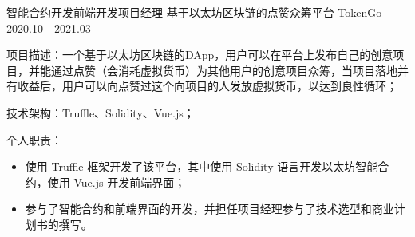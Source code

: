 \begin{cventries}
  \cventry
    {智能合约开发{\enskip\cdotp\enskip}前端开发{\enskip\cdotp\enskip}项目经理} %
    {基于以太坊区块链的点赞众筹平台 TokenGo} %
    {2020.10 - 2021.03} %
    {} %
    {
      \begin{cvitems}
        \item {项目描述：一个基于以太坊区块链的DApp，用户可以在平台上发布自己的创意项目，并能通过点赞（会消耗虚拟货币）为其他用户的创意项目众筹，当项目落地并有收益后，用户可以向点赞过这个向项目的人发放虚拟货币，以达到良性循环；} 
        \item {技术架构：Truffle、Solidity、Vue.js；}
        \item {个人职责：}
          \begin{itemize}
            \item {使用 Truffle 框架开发了该平台，其中使用 Solidity 语言开发以太坊智能合约，使用 Vue.js 开发前端界面；}
            \item {参与了智能合约和前端界面的开发，并担任项目经理参与了技术选型和商业计划书的撰写。}
          \end{itemize}
      \end{cvitems}
    }

\end{cventries}
